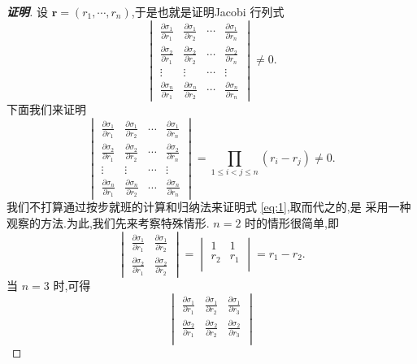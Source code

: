 \documentclass[a4paper]{article}
\newcommand{\pa}{\partial} \newcommand{\Om}{\Omega}
\begin{document}
\begin{proof}[\bf{证明}]
  设 $\mathbf{r}=(r_1,\cdots,r_n)$,于是也就是证明Jacobi 行列式
$$
\begin{vmatrix}
  \frac{\partial \sigma_1}{\partial r_1}&\frac{\partial
    \sigma_1}{\partial
    r_2}&\cdots&\frac{\partial\sigma_1}{\partial r_n}\\
  \frac{\partial \sigma_2}{\partial r_1}&\frac{\partial
    \sigma_2}{\partial
    r_2}&\cdots&\frac{\partial\sigma_2}{\partial r_n}\\
  \vdots&\vdots&\cdots&\vdots\\
  \frac{\partial \sigma_n}{\partial r_1}&\frac{\partial
    \sigma_n}{\partial r_2}&\cdots&\frac{\partial\sigma_n}{\partial
    r_n}
\end{vmatrix}\neq 0.
$$
下面我们来证明
\begin{equation}\label{eq:1}
  \begin{vmatrix}
    \frac{\pa \sigma_1}{\pa r_1}&\frac{\pa \sigma_1}{\pa
      r_2}&\cdots&\frac{\pa\sigma_1}{\pa r_n}\\
    \frac{\pa \sigma_2}{\pa r_1}&\frac{\pa \sigma_2}{\pa
      r_2}&\cdots&\frac{\pa\sigma_2}{\pa r_n}\\
    \vdots&\vdots&\cdots&\vdots\\
    \frac{\pa \sigma_n}{\pa r_1}&\frac{\pa \sigma_n}{\pa
      r_2}&\cdots&\frac{\pa\sigma_n}{\pa r_n}
  \end{vmatrix}=\prod_{1\leq i<j\leq n} (r_i-r_j)\neq 0.
\end{equation}
我们不打算通过按步就班的计算和归纳法来证明式 \eqref{eq:1},取而代之的,是
采用一种观察的方法.为此,我们先来考察特殊情形. $n=2$ 时的情形很简单,即
$$ \begin{vmatrix}
  \frac{\pa \sigma_1}{\pa r_1}&\frac{\pa \sigma_1}{\pa r_2}\\
  \frac{\pa \sigma_2}{\pa r_1}&\frac{\pa \sigma_2}{\pa r_2}
\end{vmatrix}=
\begin{vmatrix}
  1&1\\
  r_2&r_1\\
\end{vmatrix}=r_1-r_2.
$$
当 $n=3$ 时,可得
\begin{equation}\label{eq:2}
  \begin{vmatrix}
    \frac{\pa \sigma_1}{\pa r_1}&\frac{\pa\sigma_1}{\pa r_2}&\frac{\pa
      \sigma_1}{\pa r_3}\\
    \frac{\pa \sigma_2}{\pa r_1}&\frac{\pa \sigma_2}{\pa
      r_2}&\frac{\pa
      \sigma_2}{\pa r_3}\\

\end{vmatrix}
\end{equation}
\end{proof}
\end{document}
